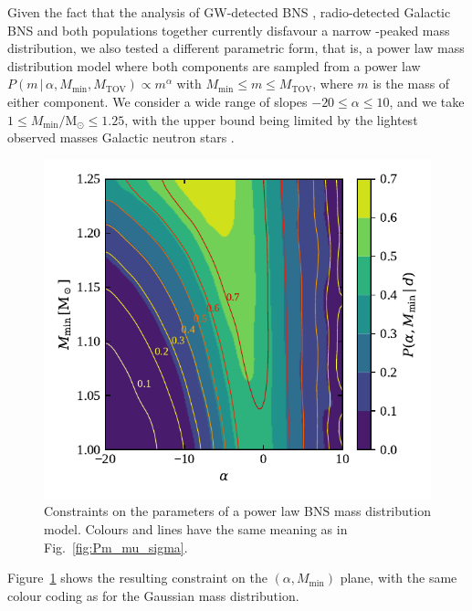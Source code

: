 \documentclass[]{aa}
\newcommand{\resp}[1]{#1}
\begin{document}
Given the fact that the analysis of GW-detected BNS \citep{LVC2021_GWTC3pop,Landry2021}, radio-detected Galactic BNS \citep{Farrow2019} and both populations together \citep{Galaudage2021} currently disfavour a narrow -peaked mass distribution, we also tested a different parametric form, that is, a power law mass distribution model where both components are sampled from a power law $P(m\,|\,\alpha,M_\mathrm{min},M_\mathrm{TOV})\propto m^\alpha$ with $M_\mathrm{min}\leq m \leq M_\mathrm{TOV}$, where $m$ is the mass of either component. \resp{We consider a wide range of slopes $-20\leq \alpha \leq 10$, and we take $1\leq M_\mathrm{min}/\mathrm{M_\odot}\leq 1.25$, with the upper bound being limited by the lightest observed masses Galactic neutron stars \citep{Farrow2019}}.
%
\begin{figure}
 \centering \includegraphics[width=\columnwidth]{figures/Pm_a_Mmin.pdf}
 \caption{Constraints on the parameters of a power law BNS mass distribution model. Colours and lines have the same meaning as in Fig.~\ref{fig:Pm_mu_sigma}.}
 \label{fig:Pm_a_Mmin}
\end{figure}
%
Figure~\ref{fig:Pm_a_Mmin} shows the resulting constraint on the $(\alpha,M_\mathrm{min})$ plane, with the same colour coding as for the Gaussian mass distribution. 
\end{document}
